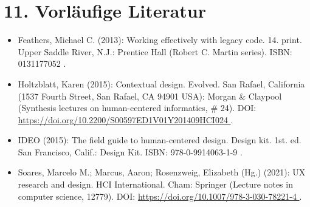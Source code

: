 \section*{11. Vorläufige Literatur}
\begin{itemize}
    \item Feathers, Michael C. (2013): Working effectively with legacy code. 14. print. Upper Saddle River, N.J.: Prentice Hall (Robert C. Martin series). ISBN: 0131177052  .
    
    \item Holtzblatt, Karen (2015): Contextual design. Evolved. San Rafael, California (1537 Fourth Street, San Rafael, CA 94901 USA): Morgan \& Claypool (Synthesis lectures on human-centered informatics, \# 24). DOI: \url{https://doi.org/10.2200/S00597ED1V01Y201409HCI024    }.
    
    \item IDEO (2015): The field guide to human-centered design. Design kit. 1st. ed. San Francisco, Calif.: Design Kit. ISBN: 978-0-9914063-1-9  .
    
    \item Soares, Marcelo M.; Marcus, Aaron; Rosenzweig, Elizabeth (Hg.) (2021): UX research and design. HCI International. Cham: Springer (Lecture notes in computer science, 12779). DOI: \url{https://doi.org/10.1007/978-3-030-78221-4    }.
\end{itemize}
